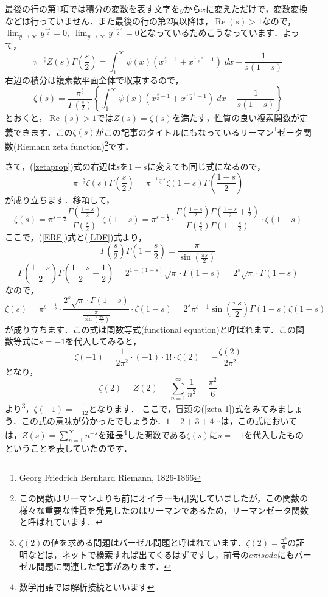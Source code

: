 \documentclass[./main]{subfile}
\begin{document}
最後の行の第1項では積分の変数を表す文字を$y$から$x$に変えただけで，変数変換などは行っていません．また最後の行の第2項以降は，$\operatorname{Re}(s)>1$なので，$\lim_{y\to\infty}y^{\frac{-s}{2}}=0,\;\lim_{y\to\infty}y^{\frac{1-s}{2}}=0$となっているためこうなっています．よって，
\begin{equation}\label{zetaprop}
\pi^{-\frac{s}{2}}Z(s)\Gamma\left(\frac{s}{2}\right)=\int_1^{\infty}\psi(x)\left(x^{\frac{s}{2}-1}+x^{\frac{1-s}{2}-1}\right)\;dx-\frac{1}{s(1-s)}
\end{equation}
右辺の積分は複素数平面全体で収束するので，
\[
\zeta(s)=\frac{\pi^{\frac{s}{2}}}{\Gamma\left(\frac{s}{2}\right)}\left\{\int_1^{\infty}\psi(x)\left(x^{\frac{s}{2}-1}+x^{\frac{1-s}{2}-1}\right)\;dx-\frac{1}{s(1-s)}\right\}
\]
とおくと，$\operatorname{Re}(s)>1$では$Z(s)=\zeta(s)$を満たす，性質の良い複素関数が定義できます．この$\zeta(s)$がこの記事のタイトルにもなっているリーマン\footnote{Georg Friedrich Bernhard Riemann, 1826-1866}ゼータ関数(Riemann zeta function)\footnote{この関数はリーマンよりも前にオイラーも研究していましたが，この関数の様々な重要な性質を発見したのはリーマンであるため，リーマンゼータ関数と呼ばれています．}です．

さて，(\ref{zetaprop})式の右辺は$s$を$1-s$に変えても同じ式になるので，
\[
\pi^{-\frac{s}{2}}\zeta(s)\Gamma\left(\frac{s}{2}\right)=\pi^{-\frac{1-s}{2}}\zeta(1-s)\Gamma\left(\frac{1-s}{2}\right)
\]
が成り立ちます．移項して，
\[
\zeta(s)=\pi^{s-\frac{1}{2}}\frac{\Gamma\left(\frac{1-s}{2}\right)}{\Gamma\left(\frac{s}{2}\right)}\zeta(1-s)=\pi^{s-\frac{1}{2}}\cdot\frac{\Gamma\left(\frac{1-s}{2}\right)\Gamma\left(\frac{1-s}{2}+\frac{1}{2}\right)}{\Gamma\left(\frac{s}{2}\right)\Gamma\left(1-\frac{s}{2}\right)}\cdot\zeta(1-s)
\]
ここで，(\ref{ERF})式と(\ref{LDF})式より，
\[
\Gamma\left(\frac{s}{2}\right)\Gamma\left(1-\frac{s}{2}\right)=\frac{\pi}{\sin\left(\frac{\pi s}{2}\right)}
\]
\[
\Gamma\left(\frac{1-s}{2}\right)\Gamma\left(\frac{1-s}{2}+\frac{1}{2}\right)=2^{1-(1-s)}\sqrt{\pi}\cdot\Gamma(1-s)=2^s\sqrt{\pi}\cdot\Gamma(1-s)
\]
なので，
\begin{equation}\label{fueq}
\zeta(s)=\pi^{s-\frac{1}{2}}\cdot\frac{2^s\sqrt{\pi}\cdot\Gamma(1-s)}{\frac{\pi}{\sin\left(\frac{\pi s}{2}\right)}}\cdot\zeta(1-s)=2^s\pi^{s-1}\sin\left(\frac{\pi s}{2}\right)\Gamma(1-s)\zeta(1-s)
\end{equation}
が成り立ちます．この式は関数等式(functional equation)と呼ばれます．この関数等式に$s=-1$を代入してみると，
\[
\zeta(-1)=\frac{1}{2\pi^2}\cdot (-1)\cdot 1!\cdot\zeta(2)=-\frac{\zeta(2)}{2\pi^2}
\]
となり，
\[
\zeta(2)=Z(2)=\sum_{n=1}^{\infty}\frac{1}{n^2}=\frac{\pi^2}{6}
\]
より\footnote{$\zeta(2)$の値を求める問題はバーゼル問題と呼ばれています．$\zeta(2)=\frac{\pi^2}{6}$の証明などは，ネットで検索すれば出てくるはずですし，前号の$e\pi isode$にもバーゼル問題に関連した記事があります．}，$\zeta(-1)=-\frac{1}{12}$となります．
ここで，冒頭の(\ref{zeta-1})式をみてみましょう．この式の意味が分かったでしょうか．$1+2+3+4\cdots$は，この式においては，$Z(s)=\sum_{n=1}^{\infty}n^{-s}$を延長\footnote{数学用語では解析接続といいます}した関数である$\zeta(s)$に$s=-1$を代入したものということを表していたのです．
\end{document}
